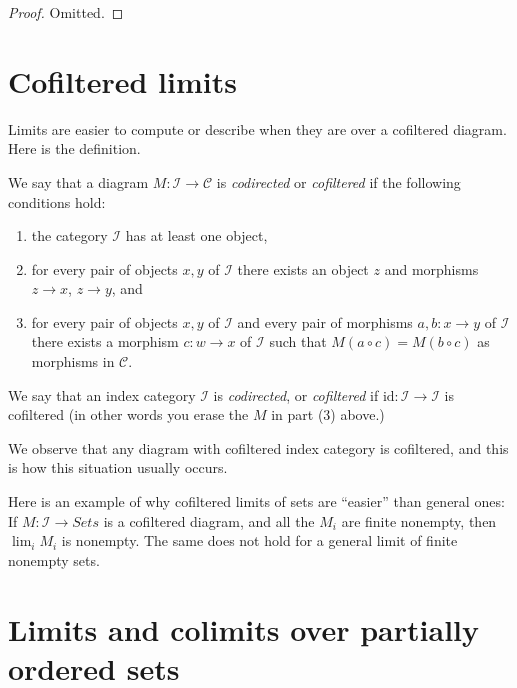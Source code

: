 \begin{proof}
Omitted.
\end{proof}



\section{Cofiltered limits}
\label{section-codirected-limits}

\noindent
Limits are easier to compute or describe when they
are over a cofiltered diagram. Here is the definition.

\begin{definition}
\label{definition-codirected}
We say that a diagram $M : \mathcal{I} \to \mathcal{C}$ is {\it codirected}
or {\it cofiltered} if the following conditions hold:
\begin{enumerate}
\item the category $\mathcal{I}$ has at least one object,
\item for every pair of objects $x, y$ of $\mathcal{I}$
there exists an object $z$ and morphisms $z \to x$,
$z \to y$, and
\item for every pair of objects $x, y$ of $\mathcal{I}$
and every pair of morphisms $a, b : x \to y$ of $\mathcal{I}$
there exists a morphism $c : w \to x$ of $\mathcal{I}$
such that $M(a \circ c) = M(b \circ c)$ as morphisms in $\mathcal{C}$.
\end{enumerate}
We say that an index category $\mathcal{I}$ is {\it codirected}, or
{\it cofiltered} if $\text{id} : \mathcal{I} \to \mathcal{I}$ is
cofiltered (in other words you erase the $M$ in part (3) above.)
\end{definition}

\noindent
We observe that any diagram with cofiltered index category is cofiltered,
and this is how this situation usually occurs.

\medskip\noindent
Here is an example of why cofiltered limits of sets are ``easier'' than
general ones: If $M : \mathcal{I} \to \textit{Sets}$ is a cofiltered diagram,
and all the $M_i$ are finite nonempty, then $\lim_i M_i$ is nonempty.
The same does not hold for a general limit of finite nonempty sets.











\section{Limits and colimits over partially ordered sets}
\label{section-posets-limits}

